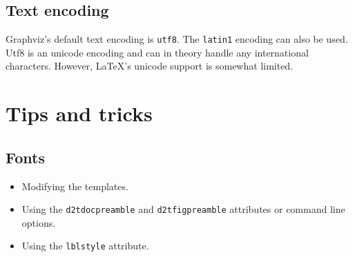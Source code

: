 \documentclass[10pt,a4paper,english]{article}
\begin{document}
\hypertarget{text-encoding}{}
\subsection*{Text encoding}
\label{text-encoding}

Graphviz's default text encoding is \texttt{utf8}. The \texttt{latin1} encoding can also be used. Utf8 is an unicode encoding and can in theory handle any international characters. However, LaTeX's unicode support is somewhat limited.



\hypertarget{tips-and-tricks}{}
\section*{Tips and tricks}
\label{tips-and-tricks}



\hypertarget{fonts}{}
\subsection*{Fonts}
\label{fonts}

\begin{itemize}
\item {} 
Modifying the templates.

\item {} 
Using the \texttt{d2tdocpreamble} and \texttt{d2tfigpreamble} attributes or command line options.

\item {} 
Using the \texttt{lblstyle} attribute.

\end{itemize}
\end{document}

